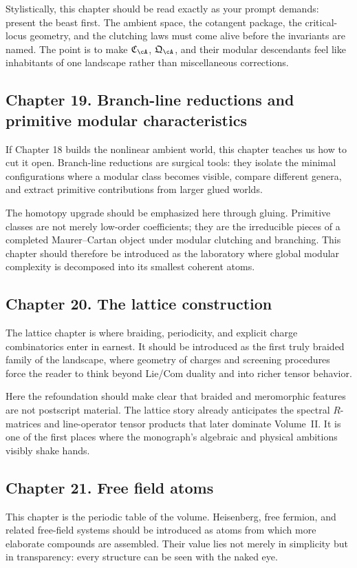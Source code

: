 Stylistically, this chapter should be read exactly as your prompt demands: present the beast first.  The ambient space, the cotangent package, the critical-locus geometry, and the clutching laws must come alive before the invariants are named.  The point is to make $\mathfrak C_{\cA}$, $\mathfrak Q_{\cA}$, and their modular descendants feel like inhabitants of one landscape rather than miscellaneous corrections.

\subsection*{Chapter 19. Branch-line reductions and primitive modular characteristics}
If Chapter 18 builds the nonlinear ambient world, this chapter teaches us how to cut it open.  Branch-line reductions are surgical tools: they isolate the minimal configurations where a modular class becomes visible, compare different genera, and extract primitive contributions from larger glued worlds.

The homotopy upgrade should be emphasized here through gluing.  Primitive classes are not merely low-order coefficients; they are the irreducible pieces of a completed Maurer--Cartan object under modular clutching and branching.  This chapter should therefore be introduced as the laboratory where global modular complexity is decomposed into its smallest coherent atoms.

\subsection*{Chapter 20. The lattice construction}
The lattice chapter is where braiding, periodicity, and explicit charge combinatorics enter in earnest.  It should be introduced as the first truly braided family of the landscape, where geometry of charges and screening procedures force the reader to think beyond Lie/Com duality and into richer tensor behavior.

Here the refoundation should make clear that braided and meromorphic features are not postscript material.  The lattice story already anticipates the spectral $R$-matrices and line-operator tensor products that later dominate Volume~II.  It is one of the first places where the monograph's algebraic and physical ambitions visibly shake hands.

\subsection*{Chapter 21. Free field atoms}
This chapter is the periodic table of the volume.  Heisenberg, free fermion, and related free-field systems should be introduced as atoms from which more elaborate compounds are assembled.  Their value lies not merely in simplicity but in transparency: every structure can be seen with the naked eye.

